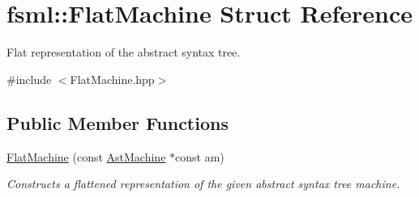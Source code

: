 \hypertarget{structfsml_1_1FlatMachine}{\section{fsml\-:\-:Flat\-Machine Struct Reference}
\label{structfsml_1_1FlatMachine}
}


Flat representation of the abstract syntax tree.  




{\ttfamily \#include $<$Flat\-Machine.\-hpp$>$}

\subsection*{Public Member Functions}
\begin{DoxyCompactItemize}
\item 
\hyperlink{structfsml_1_1FlatMachine_a642e6c3c6b52364b9543b92ec4634c49}{Flat\-Machine} (const \hyperlink{structfsml_1_1AstMachine}{Ast\-Machine} $\ast$const am)
\begin{DoxyCompactList}\small\item\em Constructs a flattened representation of the given abstract syntax tree machine. \end{DoxyCompactList}\end{DoxyCompactItemize}
